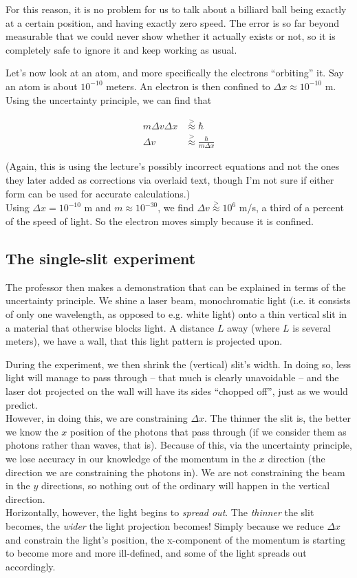 \documentclass[8.01x]{subfiles}
\begin{document}
For this reason, it is no problem for us to talk about a billiard ball being exactly at a certain position, and having exactly zero speed. The error is so far beyond measurable that we could never show whether it actually exists or not, so it is completely safe to ignore it and keep working as usual.

Let's now look at an atom, and more specifically the electrons ``orbiting'' it. Say an atom is about $10^{-10}$ meters. An electron is then confined to $\Delta x \approx 10^{-10}$ m. Using the uncertainty principle, we can find that

\begin{align}
m \Delta v \Delta x &\overset{>}{\approx} \hbar\\
\Delta v  &\overset{>}{\approx} \frac{\hbar}{m \Delta x}
\end{align}

(Again, this is using the lecture's possibly incorrect equations and not the ones they later added as corrections via overlaid text, though I'm not sure if either form can be used for accurate calculations.)\\
Using $\Delta x = 10^{-10}$ m and $m \approx 10^{-30}$, we find $\Delta v \overset{>}{\approx} 10^6$ m/s, a third of a percent of the speed of light. So the electron moves simply because it is confined.

\subsection{The single-slit experiment}

The professor then makes a demonstration that can be explained in terms of the uncertainty principle. We shine a laser beam, monochromatic light (i.e. it consists of only one wavelength, as opposed to e.g. white light) onto a thin vertical slit in a material that otherwise blocks light. A distance $L$ away (where $L$ is several meters), we have a wall, that this light pattern is projected upon.

During the experiment, we then shrink the (vertical) slit's width. In doing so, less light will manage to pass through -- that much is clearly unavoidable -- and the laser dot projected on the wall will have its sides ``chopped off'', just as we would predict.\\
However, in doing this, we are constraining $\Delta x$. The thinner the slit is, the better we know the $x$ position of the photons that pass through (if we consider them as photons rather than waves, that is). Because of this, via the uncertainty principle, we lose accuracy in our knowledge of the momentum in the $x$ direction (the direction we are constraining the photons in).
We are not constraining the beam in the $y$ directions, so nothing out of the ordinary will happen in the vertical direction.\\
Horizontally, however, the light begins to \emph{spread out}. The \emph{thinner} the slit becomes, the \emph{wider} the light projection becomes! Simply because we reduce $\Delta x$ and constrain the light's position, the x-component of the momentum is starting to become more and more ill-defined, and some of the light spreads out accordingly.
\end{document}
